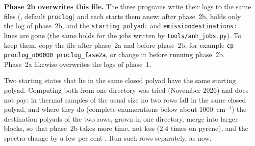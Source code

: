 \begin{description}
  \textbf{Phase 2b overwrites this file.} The three programs write their
  logs to the same files (, default \texttt{proclog})
  and each starts them anew: after phase~2b, 
  holds only the log of phase~2b, and the \texttt{starting polyad:} and
  \texttt{emissiondestinations:} lines are gone (the same holds for the
  jobs written by \texttt{tools/anh\_jobs.py}). To keep them, copy the
  file after phase~2a and before phase~2b, for example
  \texttt{cp proclog\_n00000 proclog\_fase2a}, or change
   in  before running phase~2b. Phase~2a
  likewise overwrites the logs of phase~1.

  Two starting states that lie in the same closed polyad have the same
  starting polyad. Computing both from one directory was tried (November
  2026) and does not pay: in thermal samples of the usual size no two
  rows fall in the same closed polyad, and where they do (complete
  enumerations below about 1000~cm$^{-1}$) the destination polyads of the
  two rows, grown in one directory, merge into larger blocks, so that
  phase~2b takes more time, not less (2.4 times on pyrene), and the
  spectra change by a few per cent .
  Run such rows separately, as now.
\end{description}

